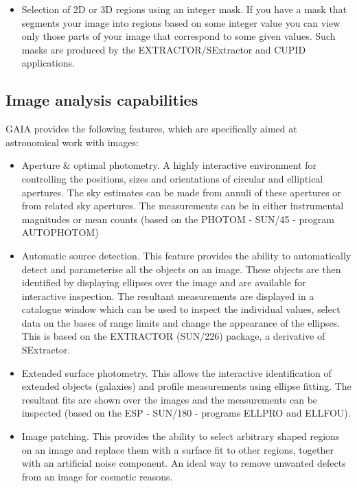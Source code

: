 \documentclass[twoside,11pt]{article}
\newcommand{\xref}[3]{#1}
\newcommand{\xlabel}[1]{}
\renewcommand{\_}{\texttt{\symbol{95}}}
\begin{document}
\begin{itemize}
\item Selection of 2D or 3D regions using an integer mask. If you have a mask
  that segments your image into regions based on some integer value you can
  view only those parts of your image that correspond to some given values.
  Such masks are produced by the \xref{EXTRACTOR/SExtractor}{sun226}{}
  and \xref{CUPID}{sun255}{} applications.

\end{itemize}

\subsection{\xlabel{image_analysis_capabilities}Image analysis capabilities}
GAIA provides the following features, which are specifically aimed at
astronomical work with images:
\begin{itemize}
\item Aperture \& optimal photometry. A highly interactive environment
  for controlling the positions, sizes and orientations of circular
  and elliptical apertures. The sky estimates can be made from
  annuli of these apertures or from related sky apertures. The
  measurements can be in either instrumental magnitudes or
  mean counts (based on the PHOTOM - \xref{SUN/45}{sun45}{} -
  program \xref{AUTOPHOTOM}{sun45}{AUTOPHOTOM})

\item Automatic source detection. This feature provides the ability to
  automatically detect and parameterise all the objects on an
  image. These objects are then identified by displaying ellipses over
  the image and are available for interactive inspection. The resultant
  measurements are displayed in a catalogue window which can be used to
  inspect the individual values, select data on the bases of range
  limits and change the appearance of the ellipses. This is based on the
  EXTRACTOR (\xref{SUN/226}{sun226}{}) package, a derivative of
  SExtractor.

\item Extended surface photometry. This allows the interactive
  identification of extended objects (galaxies) and profile
  measurements using ellipse fitting. The resultant fits are shown
  over the images and the measurements can be inspected (based on the
  ESP - \xref{SUN/180}{sun180}{} - programs
  \xref{ELLPRO}{sun180}{ELLPRO} and \xref{ELLFOU}{sun180}{ELLFOU}).

\item Image patching. This provides the ability to select arbitrary
  shaped regions on an image and replace them with a surface fit
  to other regions, together with an artificial noise component.
  An ideal way to remove unwanted defects from an image for
  cosmetic reasons.


\end{itemize}
\end{document}
